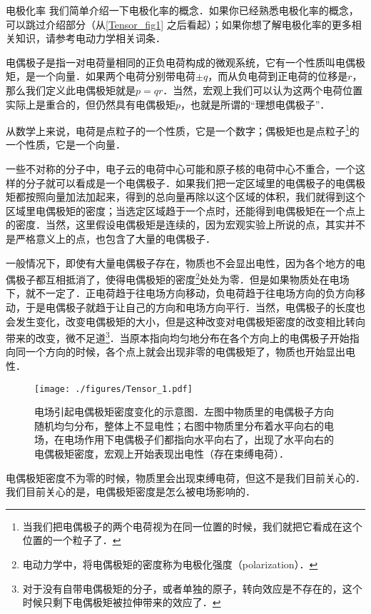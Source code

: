 \begin{example}{电极化率}
我们简单介绍一下电极化率的概念．如果你已经熟悉电极化率的概念，可以跳过介绍部分（从\autoref{Tensor_fig1} 之后看起）；如果你想了解电极化率的更多相关知识，请参考电动力学相关词条．

电偶极子是指一对电荷量相同的正负电荷构成的微观系统，它有一个性质叫电偶极矩，是一个向量．如果两个电荷分别带电荷$\pm q$，而从负电荷到正电荷的位移是${r}$，那么我们定义此电偶极矩就是${p}=q{r}$．当然，宏观上我们可以认为这两个电荷位置实际上是重合的，但仍然具有电偶极矩${p}$，也就是所谓的“理想电偶极子”．

从数学上来说，电荷是点粒子的一个性质，它是一个数字；偶极矩也是点粒子\footnote{当我们把电偶极子的两个电荷视为在同一位置的时候，我们就把它看成在这个位置的一个粒子了．}的一个性质，它是一个向量．

一些不对称的分子中，电子云的电荷中心可能和原子核的电荷中心不重合，一个这样的分子就可以看成是一个电偶极子．如果我们把一定区域里的电偶极子的电偶极矩都按照向量加法加起来，得到的总向量再除以这个区域的体积，我们就得到这个区域里电偶极矩的密度；当选定区域趋于一个点时，还能得到电偶极矩在一个点上的密度．当然，这里假设电偶极矩是连续的，因为宏观实验上所说的点，其实并不是严格意义上的点，也包含了大量的电偶极子．

一般情况下，即使有大量电偶极子存在，物质也不会显出电性，因为各个地方的电偶极子都互相抵消了，使得电偶极矩的密度\footnote{电动力学中，将电偶极矩的密度称为电极化强度（polarization）．}处处为零．但是如果物质处在电场下，就不一定了．正电荷趋于往电场方向移动，负电荷趋于往电场方向的负方向移动，于是电偶极子就趋于让自己的方向和电场方向平行．当然，电偶极子的长度也会发生变化，改变电偶极矩的大小，但是这种改变对电偶极矩密度的改变相比转向带来的改变，微不足道\footnote{对于没有自带电偶极矩的分子，或者单独的原子，转向效应是不存在的，这个时候只剩下电偶极矩被拉伸带来的效应了．}．当原本指向均匀地分布在各个方向上的电偶极子开始指向同一个方向的时候，各个点上就会出现非零的电偶极矩了，物质也开始显出电性．

\begin{figure}[ht]
\centering
\texttt{[image: ./figures/Tensor\_1.pdf]}
\caption{电场引起电偶极矩密度变化的示意图．左图中物质里的电偶极子方向随机均匀分布，整体上不显电性；右图中物质里分布着水平向右的电场，在电场作用下电偶极子们都指向水平向右了，出现了水平向右的电偶极矩密度，宏观上开始表现出电性（存在束缚电荷）．} \label{Tensor_fig1}
\end{figure}

电偶极矩密度不为零的时候，物质里会出现束缚电荷，但这不是我们目前关心的．我们目前关心的是，电偶极矩密度是怎么被电场影响的．


\end{example}
